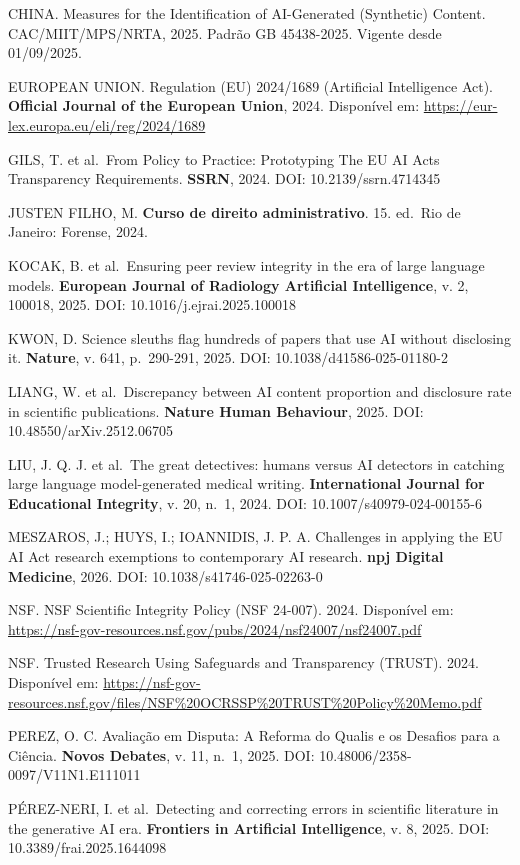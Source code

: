 \documentclass[
  12pt,
  a4paper,
  brazil,
  twoside
]{report}
\begin{document}
CHINA. Measures for the Identification of AI-Generated (Synthetic)
Content. CAC/MIIT/MPS/NRTA, 2025. Padrão GB 45438-2025. Vigente desde
01/09/2025.

EUROPEAN UNION. Regulation (EU) 2024/1689 (Artificial Intelligence Act).
\textbf{Official Journal of the European Union}, 2024. Disponível em:
\url{https://eur-lex.europa.eu/eli/reg/2024/1689}

GILS, T. et al.~From Policy to Practice: Prototyping The EU AI
Act\textquotesingle s Transparency Requirements. \textbf{SSRN}, 2024.
DOI: 10.2139/ssrn.4714345

JUSTEN FILHO, M. \textbf{Curso de direito administrativo}. 15. ed.~Rio
de Janeiro: Forense, 2024.

KOCAK, B. et al.~Ensuring peer review integrity in the era of large
language models. \textbf{European Journal of Radiology Artificial
Intelligence}, v. 2, 100018, 2025. DOI: 10.1016/j.ejrai.2025.100018

KWON, D. Science sleuths flag hundreds of papers that use AI without
disclosing it. \textbf{Nature}, v. 641, p.~290-291, 2025. DOI:
10.1038/d41586-025-01180-2

LIANG, W. et al.~Discrepancy between AI content proportion and
disclosure rate in scientific publications. \textbf{Nature Human
Behaviour}, 2025. DOI: 10.48550/arXiv.2512.06705

LIU, J. Q. J. et al.~The great detectives: humans versus AI detectors in
catching large language model-generated medical writing.
\textbf{International Journal for Educational Integrity}, v. 20, n.~1,
2024. DOI: 10.1007/s40979-024-00155-6

MESZAROS, J.; HUYS, I.; IOANNIDIS, J. P. A. Challenges in applying the
EU AI Act research exemptions to contemporary AI research. \textbf{npj
Digital Medicine}, 2026. DOI: 10.1038/s41746-025-02263-0

NSF. NSF Scientific Integrity Policy (NSF 24-007). 2024. Disponível em:
\url{https://nsf-gov-resources.nsf.gov/pubs/2024/nsf24007/nsf24007.pdf}

NSF. Trusted Research Using Safeguards and Transparency (TRUST). 2024.
Disponível em:
\url{https://nsf-gov-resources.nsf.gov/files/NSF\%20OCRSSP\%20TRUST\%20Policy\%20Memo.pdf}

PEREZ, O. C. Avaliação em Disputa: A Reforma do Qualis e os Desafios
para a Ciência. \textbf{Novos Debates}, v. 11, n.~1, 2025. DOI:
10.48006/2358-0097/V11N1.E111011

PÉREZ-NERI, I. et al.~Detecting and correcting errors in scientific
literature in the generative AI era. \textbf{Frontiers in Artificial
Intelligence}, v. 8, 2025. DOI: 10.3389/frai.2025.1644098
\end{document}
